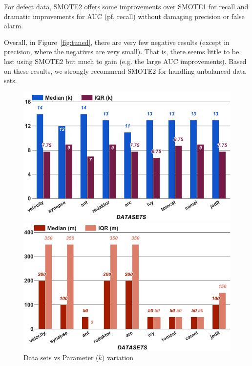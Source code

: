 \begin{lesson1}
    For defect data, SMOTE2  
 offers   some  improvements over SMOTE1 for recall
 and dramatic improvements for AUC (pf, recall) without damaging precision or false
 alarm.
\end{lesson1}

Overall, in  Figure~\ref{fig:tuned},
there are very few negative results
(except in precision, where the negatives
are very small). That is, there
seems little to be lost using SMOTE2
but much to gain (e.g. the large AUC improvements).
Based on these results, we strongly
recommend SMOTE2 for handling unbalanced
data sets.

\begin{figure}[!t]
    \centering
    \begin{minipage}{.33\textwidth}
        \captionsetup{justification=centering,singlelinecheck=off}
        \includegraphics[width=.95\linewidth]{./fig/k.png}
        \caption{Data sets vs Parameter ($k$) variation}
        \label{RQ3:k}
    \end{minipage}%
    \begin{minipage}{.33\textwidth}
        \captionsetup{labelsep=space,justification=centering,singlelinecheck=off}
        \includegraphics[width=.95\linewidth]{./fig/m.png}

\end{minipage}
\end{figure}
